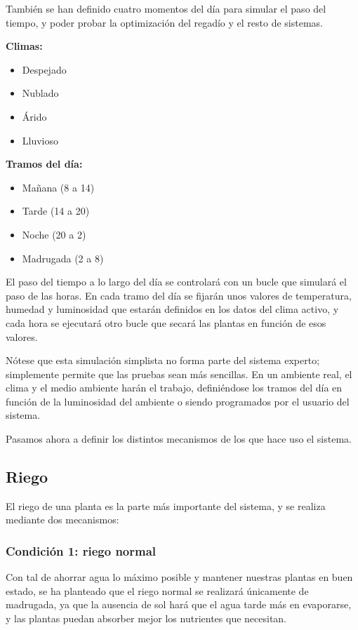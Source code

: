 \documentclass[11pt,a4paper]{article}
\begin{document}
También se han definido cuatro momentos del día para simular el paso del tiempo, y poder probar la optimización del regadío y el resto de sistemas.

\textbf{Climas:}
\begin{itemize}
\item Despejado
\item Nublado
\item Árido
\item Lluvioso
\end{itemize}

\textbf{Tramos del día:}
\begin{itemize}
\item Mañana (8 a 14)
\item Tarde (14 a 20)
\item Noche (20 a 2)
\item Madrugada (2 a 8)
\end{itemize}

El paso del tiempo a lo largo del día se controlará con un bucle que simulará el paso de las horas. En cada tramo del día se fijarán unos valores de temperatura, humedad y luminosidad que estarán definidos en los datos del clima activo, y cada hora se ejecutará otro bucle que secará las plantas en función de esos valores.

Nótese que esta simulación simplista no forma parte del sistema experto; simplemente permite que las pruebas sean más sencillas. En un ambiente real, el clima y el medio ambiente harán el trabajo, definiéndose los tramos del día en función de la luminosidad del ambiente o siendo programados por el usuario del sistema.

Pasamos ahora a definir los distintos mecanismos de los que hace uso el sistema.

\subsection{Riego}
El riego de una planta es la parte más importante del sistema, y se realiza mediante dos mecanismos:

\subsubsection*{Condición 1: riego normal}
Con tal de ahorrar agua lo máximo posible y mantener nuestras plantas en buen estado, se ha planteado que el riego normal se realizará únicamente de madrugada, ya que la ausencia de sol hará que el agua tarde más en evaporarse, y las plantas puedan absorber mejor los nutrientes que necesitan. 
\end{document}
